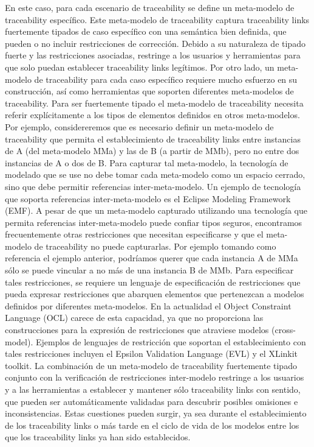 \documentclass[a4paper,12pt,oneside]{book}
\begin{document}
En este caso, para cada escenario de traceability se define un meta-modelo de traceability específico. Este meta-modelo de traceability captura traceability links fuertemente tipados de caso específico con una semántica bien definida, que pueden o no incluir restricciones de corrección. Debido a su naturaleza de tipado fuerte y las restricciones asociadas, restringe a los usuarios y herramientas para que solo puedan establecer traceability links legítimos. Por otro lado, un meta-modelo de traceability para cada caso específico requiere mucho esfuerzo en su construcción, así como herramientas que soporten diferentes meta-modelos de traceability.
Para ser fuertemente tipado el meta-modelo de traceability necesita referir explícitamente a los tipos de elementos definidos en otros meta-modelos. Por ejemplo, considereremos que es necesario definir un meta-modelo de traceability que permita el establecimiento de traceability links entre instancias de A (del meta-modelo MMa) y las de B (a partir de MMb), pero no entre dos instancias de A o dos de B. Para capturar tal meta-modelo, la tecnología de modelado que se use no debe tomar cada meta-modelo como un espacio cerrado, sino que debe permitir referencias inter-meta-modelo. Un ejemplo de tecnología que soporta referencias inter-meta-modelo es el Eclipse Modeling Framework (EMF).
A pesar de que un meta-modelo capturado utilizando una tecnología que permita referencias inter-meta-modelo puede confiar tipos seguros, encontramos frecuentemente otras restricciones que necesitan especificarse y que el meta-modelo de traceability no puede capturarlas. Por ejemplo tomando como referencia el ejemplo anterior, podríamos querer que cada instancia A de MMa sólo se puede vincular a no más de una instancia B de MMb. Para especificar tales restricciones, se requiere un lenguaje de especificación de restricciones que pueda expresar restricciones que abarquen elementos que pertenezcan a modelos definidos por diferentes meta-modelos. En la actualidad el Object Constraint Language (OCL) carece de esta capacidad, ya que no proporciona las construcciones para la expresión de restricciones que atraviese modelos (cross-model). Ejemplos de lenguajes de restricción que soportan el establecimiento con tales restricciones incluyen el Epsilon Validation Language (EVL) y el XLinkit toolkit.
La combinación de un meta-modelo de traceability fuertemente tipado conjunto con la verificación de restricciones inter-modelo restringe a los usuarios y a las herramientas a establecer y mantener sólo traceability links con sentido, que pueden ser automáticamente validadas para descubrir posibles omisiones e inconsistencias. Estas cuestiones pueden surgir, ya sea durante el establecimiento de los traceability links o más tarde en el ciclo de vida de los modelos entre los que los traceability links ya han sido establecidos.
\end{document}
